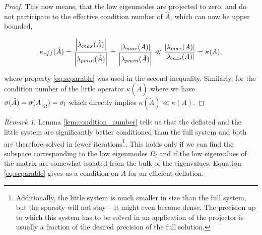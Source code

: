 \documentclass{article}
\newcommand\restr[2]{{%
  \left.\kern-\nulldelimiterspace %
  #1 %
  \vphantom{\big|} %
  \right|_{#2} %
  }
}
\theoremstyle{plain} %
\theoremstyle{convention} %
\theoremstyle{remark} %
\newtheorem*{remark}{Remark} %
\def\df#1{\textbf{\textit{#1}}}
\numberwithin{equation}{section}
\begin{document}
\begin{proof}

This now means, that the low eigenmodes are projected to zero, and do not participate to the effective condition number of $\hat{A}$, which can now be upper bounded,

\begin{align*}
    \kappa_{eff}({\hat{A}}) = \frac{\abs{\lambda_{max}(\hat{A})}}{\abs{\lambda_{pmin}(\hat{A})}} = \frac{\abs{\lambda_{max}(A)}}{\abs{\lambda_{pmin}(\hat{A})}} \ll \frac{\abs{\lambda_{max}(A)}}{\abs{\lambda_{min}(A)}} = \kappa({A}),
\end{align*}

where property \eqref{eq:separable} was used in the second inequality. Similarly, for the condition number of the little operator $\kappa({\tilde{A}})$ where we have $\sigma(\tilde{A}) = \sigma(\restr{A}{\Omega}) = \sigma_l$ which directly implies $\kappa(\tilde{A}) \ll \kappa(A)$. 

\end{proof}

\begin{remark}
Lemma \ref{lem:condition_number} tells us that the deflated and the little system are significantly better conditioned than the full system and both are therefore solved in fewer iterations\footnote{Additionally, the little system is much smaller in size than the full system, but the sparsity will not stay -- it might even become dense. The precision up to which this system has to be solved in an application of the projector is usually a fraction of the desired precision of the full solution.}. This holds only if we can find the subspace corresponding to the low eigenmodes $\Omega_l$ and if the low eigenvalues of the matrix are somewhat isolated from the bulk of the eigenvalues. Equation \eqref{eq:separable} gives us a condition on $A$ for an efficient deflation.
\end{remark}
\end{document}
